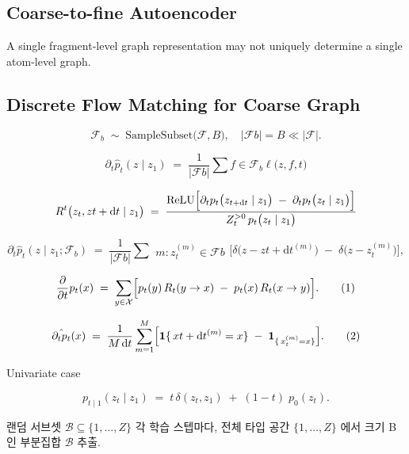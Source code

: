 \subsection{Coarse-to-fine Autoencoder} 
\label{sec:coarse_fine_ae}

A single fragment‐level graph representation may not uniquely determine a single atom‐level graph. 



\subsection{Discrete Flow Matching for Coarse Graph} 
\label{sec:coarse_graph_dfm}




\[
\mathcal{F}_b \;\sim\; \text{SampleSubset}\bigl(\mathcal{F}, B\bigr),
\quad
|\mathcal{F}b| = B \ll |\mathcal{F}|.
\]


\[
\partial_t \hat{p}_t(z \mid z_1)
\;=\;
\frac{1}{|\mathcal{F}b|}
\sum{f \in \mathcal{F}_b}
\ell\bigl(z, f, t\bigr)
\]

\[
R^t\bigl(z_t, z{t+\mathrm{d}t} \mid z_1\bigr)
\;=\;
\frac{\mathrm{ReLU}
\Bigl[\partial_t p_t\bigl(z_{t+\mathrm{d}t}\mid z_1\bigr)
\;-\;
\partial_t p_t\bigl(z_t\mid z_1\bigr)\Bigr]}
{Z^{>0}_t \, p_t\bigl(z_t\mid z_1\bigr)}
\]

\[
\partial_t \hat{p}_t(z \mid z_1; \mathcal{F}_b)
\;=\;
\frac{1}{|\mathcal{F}b|}
\sum{\substack{m : z_t^{(m)} \in \mathcal{F}b}}
\bigl[
\delta\bigl(z - z{t+\mathrm{d}t}^{(m)}\bigr)
\;-\;
\delta\bigl(z - z_t^{(m)}\bigr)
\bigr],
\]



\[
\frac{\partial}{\partial t} p_t(x)
\;=\;
\sum_{y \in \mathcal{X}}
\Bigl[
p_t(y)\,R_{t}(y \to x)
\;-\;
p_t(x)\,R_{t}(x \to y)
\Bigr].
\tag{1}
\]



\[
\hat{\partial_t p_t}(x)
\;=\;
\frac{1}{M \,\mathrm{d}t}
\sum_{m=1}^{M}
\Bigl[
\mathbf{1}{\{\,x{t+\mathrm{d}t}^{(m)}=x\}}
\;-\;
\mathbf{1}_{\{\,x_t^{(m)}=x\}}
\Bigr].
\tag{2}
\]

Univariate case

\[
p_{t\mid 1}(z_t \mid z_1)
\;=\;
t \,\delta(z_t, z_1)
\;+\; (1 - t)\; p_0(z_t).
\tag{1}
\]

랜덤 서브셋 $\mathcal{B} \subseteq \{1,\dots,Z\}$ 각 학습 스텝마다, 전체 타입 공간 $\{1,\dots,Z\}$ 에서 크기 B 인 부분집합 $\mathcal{B}$ 추출.

